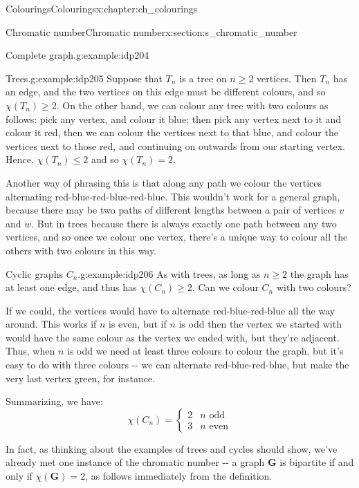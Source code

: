 \documentclass[oneside,10pt,]{book}
\numberwithin{equation}{section}
\newcommand{\bfG}{\mathbf{G}}
\begin{document}
\begin{chapterptx}{Colourings}{}{Colourings}{}{}{x:chapter:ch_colourings}
\begin{sectionptx}{Chromatic number}{}{Chromatic number}{}{}{x:section:s_chromatic_number}
\begin{example}{Complete graph.}{g:example:idp204}
\end{example}
\begin{example}{Trees.}{g:example:idp205}%
Suppose that \(T_n\) is a tree on \(n\geq 2\) vertices.  Then \(T_n\) has an edge, and the two vertices on this edge must be different colours, and so \(\chi(T_n)\geq 2\).  On the other hand, we can colour any tree with two colours as follows: pick any vertex, and colour it blue; then pick any vertex next to it and colour it red, then we can colour the vertices next to that blue, and colour the vertices next to those red, and continuing on outwards from our starting vertex.  Hence, \(\chi(T_n)\leq 2\) and so \(\chi(T_n)=2\).%
\par
Another way of phrasing this is that along any path we colour the vertices alternating red-blue-red-blue-red-blue.  This wouldn't work for a general graph, because there may be two paths of different lengths between a pair of vertices \(v\) and \(w\).  But in trees because there is always exactly one path between any two vertices, and so once we colour one vertex, there's a unique way to colour all the others with two colours in this way.%
\end{example}
\begin{example}{Cyclic graphs \(C_n\).}{g:example:idp206}%
As with trees, as long as \(n\geq 2\) the graph has at least one edge, and thus has \(\chi(C_n)\geq 2\).  Can we colour \(C_n\) with two colours?%
\par
If we could, the vertices would have to alternate red-blue-red-blue all the way around.  This works if \(n\) is even, but if \(n\) is odd then the vertex we started with would have the same colour as the vertex we ended with, but they're adjacent.  Thus, when \(n\) is odd we need at least three colours to colour the graph, but it's easy to do with three colours -{}-{} we can alternate red-blue-red-blue, but make the very last vertex green, for instance.%
\par
Summarizing, we have:%
\begin{equation*}
\chi(C_n)=\begin{cases} 2 & n \text{ odd} \\ 3 & n \text{ even} \end{cases}
\end{equation*}
%
\end{example}
In fact, as thinking about the examples of trees and cycles should show, we've already met one instance of the chromatic number -{}-{} a graph \(\bfG\) is bipartite if and only if \(\chi(\bfG)=2\), as follows immediately from the definition.%

\end{sectionptx}
\end{chapterptx}
\end{document}
